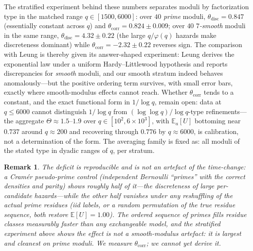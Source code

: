 \documentclass[11pt]{article}
\newtheorem{remark}{Remark}
\theoremstyle{definition}
\begin{document}
The stratified experiment behind these numbers separates moduli by
factorization type in the matched range $q\in[1500,6000]$: over $40$
\emph{prime} moduli, $\theta_{\mathrm{disc}}=0.847$ (essentially
constant across $q$) and $\theta_{\mathrm{corr}}=0.824\pm0.009$;
over $40$ \emph{$7$-smooth} moduli in the same range,
$\theta_{\mathrm{disc}}=4.32\pm0.22$ (the large $q/\varphi(q)$
hazards make discreteness dominant) while
$\theta_{\mathrm{corr}}=-2.32\pm0.22$ reverses sign.  The comparison
with Leung \cite{Leung} is thereby given its answer-shaped
experiment: Leung derives the exponential law under
a uniform Hardy--Littlewood hypothesis and reports discrepancies for
\emph{smooth} moduli, and our smooth stratum indeed behaves
anomalously---but the positive ordering term survives, with small
error bars, exactly where smooth-modulus effects cannot reach.
Whether $\theta_{\mathrm{corr}}$ tends to a constant, and the exact
functional form in $1/\log q$, remain open: data at $q\le6000$ cannot
distinguish $1/\log q$ from $(\log\log q)/\log q$-type
refinements---the aggregate $\Theta\approx1.5$--$1.9$ over
$q\in[10^2,6\times10^3]$, with $\mathbb E_a[U]$ bottoming near
$0.737$ around $q\approx200$ and recovering through $0.776$ by
$q\approx6000$, is calibration, not a determination of the form.  The
averaging family is fixed as: all moduli of the stated type in
dyadic ranges of $q$, per stratum.

\begin{remark}\label{r:c22}
The deficit is reproducible and is \emph{not} an artefact of the
time-change: a Cram\'er pseudo-prime control (independent Bernoulli
``primes'' with the correct densities and parity) shows roughly half
of it---the discreteness of large per-candidate hazards---while the
other half vanishes under any reshuffling of the actual prime residues
(iid labels, or a random permutation of the true residue sequence,
both restore $\mathbb E[U]=1.00$).  The ordered sequence of primes
fills residue classes measurably faster than any exchangeable model,
and the stratified experiment above shows the effect is not a
smooth-modulus artefact: it is largest and cleanest on prime moduli.
We measure $\theta_{\mathrm{corr}}$; we cannot yet derive it.
\end{remark}
\end{document}
